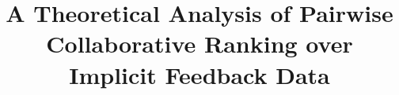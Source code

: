 \documentclass[conference]{IEEEtran}
\numberwithin{equation}{section}
\newtheorem{sampling strategy}{Sampling Strategy}
\begin{document}
\title{A Theoretical Analysis of Pairwise Collaborative Ranking over Implicit Feedback Data }


\author{
 }

\maketitle
\end{document}

